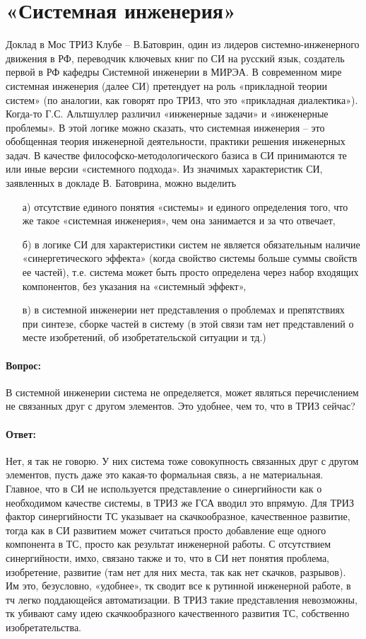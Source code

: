 \documentclass[11pt,a4paper]{article}
\begin{document}
\section{«Системная инженерия»}
Доклад в Мос ТРИЗ Клубе – В.Батоврин, один из лидеров системно-инженерного
движения в РФ, переводчик ключевых книг по СИ на русский язык, создатель
первой в РФ кафедры Системной инженерии в МИРЭА. В современном мире системная
инженерия (далее СИ) претендует на роль «прикладной теории систем» (по
аналогии, как говорят про ТРИЗ, что это «прикладная диалектика»).  Когда-то
Г.С. Альтшуллер различил «инженерные задачи» и «инженерные проблемы». В этой
логике можно сказать, что системная инженерия – это обобщенная теория
инженерной деятельности, практики решения инженерных задач. В качестве
философско-методологического базиса в СИ принимаются те или иные версии
«системного подхода».  Из значимых характеристик СИ, заявленных в докладе
В. Батоврина, можно выделить 
\begin{itemize}
\item[а)] отсутствие единого понятия «системы» и единого определения того, что
  же такое «системная инженерия», чем она занимается и за что отвечает,
\item[б)] в логике СИ для характеристики систем не является обязательным
  наличие «синергетического эффекта» (когда свойство системы больше суммы
  свойств ее частей), т.е. система может быть просто определена через набор
  входящих компонентов, без указания на «системный эффект»,
\item[в)] в системной инженерии нет представления о проблемах и препятствиях
  при синтезе, сборке частей в систему (в этой связи там нет представлений о
  месте изобретений, об изобретательской ситуации и тд.)
\end{itemize}

\paragraph{Вопрос:}
В системной инженерии система не определяется, может являться перечислением не
связанных друг с другом элементов. Это удобнее, чем то, что в ТРИЗ сейчас?

\paragraph{Ответ:}
Нет, я так не говорю. У них система тоже совокупность связанных друг с другом
элементов, пусть даже это какая-то формальная связь, а не материальная.
Главное, что в СИ не используется представление о синергийности как о
необходимом качестве системы, в ТРИЗ же ГСА вводил это впрямую. Для ТРИЗ
фактор синергийности ТС указывает на скачкообразное, качественное развитие,
тогда как в СИ развитием может считаться просто добавление еще одного
компонента в ТС, просто как результат инженерной работы. С отсутствием
синергийности, имхо, связано также и то, что в СИ нет понятия проблема,
изобретение, развитие (там нет для них места, так как нет скачков, разрывов).
Им это, безусловно, «удобнее», тк сводит все к рутинной инженерной работе, в
тч легко поддающейся автоматизации. В ТРИЗ такие представления невозможны, тк
убивают саму идею скачкообразного качественного развития ТС, собственно
изобретательства.
\end{document}
